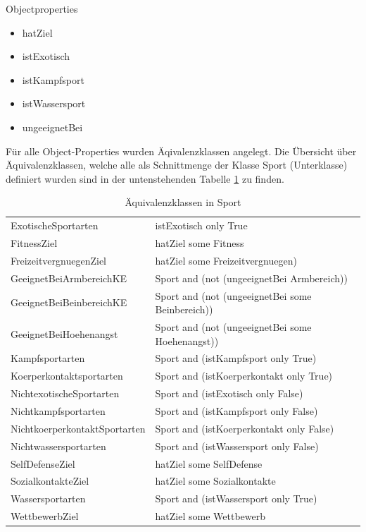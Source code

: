Objectproperties
\begin{itemize}
	\item hatZiel
	\item istExotisch
	\item istKampfsport
	\item istWassersport
	\item ungeeignetBei
\end{itemize}

Für alle Object-Properties wurden Äqivalenzklassen angelegt. Die Übersicht über Äquivalenzklassen, welche alle als Schnittmenge der Klasse Sport (Unterklasse) definiert wurden sind in der untenstehenden Tabelle \ref{aqclsport} zu finden.

\begin{table}%
\begin{tabular}{ll}
ExotischeSportarten & istExotisch only True\\
FitnessZiel & hatZiel some Fitness\\
FreizeitvergnuegenZiel & hatZiel some  Freizeitvergnuegen)\\
GeeignetBeiArmbereichKE & Sport and (not (ungeeignetBei Armbereich))\\
GeeignetBeiBeinbereichKE & Sport and (not (ungeeignetBei some Beinbereich)) \\
GeeignetBeiHoehenangst & Sport and (not (ungeeignetBei some Hoehenangst))\\
Kampfsportarten & Sport and (istKampfsport only True)\\
Koerperkontaktsportarten & Sport and (istKoerperkontakt only True)\\
NichtexotischeSportarten & Sport and (istExotisch only False)\\
Nichtkampfsportarten & Sport and (istKampfsport only False)\\
NichtkoerperkontaktSportarten & Sport and (istKoerperkontakt only False)\\
Nichtwassersportarten & Sport and (istWassersport only False)\\
SelfDefenseZiel & hatZiel some SelfDefense\\
SozialkontakteZiel & hatZiel some Sozialkontakte\\
Wassersportarten & Sport and (istWassersport only True)\\
WettbewerbZiel & hatZiel some Wettbewerb\\
\end{tabular}
\caption{Äquivalenzklassen in Sport}
\label{aqclsport}
\end{table}

